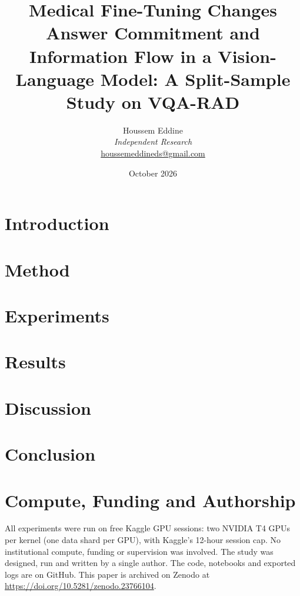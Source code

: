 \documentclass[11pt,a4paper]{article}
\title{\textbf{Medical Fine-Tuning Changes Answer Commitment and Information Flow in a Vision-Language Model: A Split-Sample Study on VQA-RAD}}
\author{%
  Houssem Eddine\\
  \textit{Independent Research}\\
  \href{mailto:houssemeddineds@gmail.com}{houssemeddineds@gmail.com}
}
\date{October 2026}
\begin{document}
\maketitle

\begin{abstract}

\end{abstract}

\section{Introduction}


\section{Method}


\section{Experiments}


\section{Results}


\section{Discussion}
\label{sec:discussion}


\section{Conclusion}
\label{sec:conclusion}


\section*{Compute, Funding and Authorship}
All experiments were run on free Kaggle GPU sessions: two NVIDIA T4 GPUs per kernel
(one data shard per GPU), with Kaggle's 12-hour session cap. No institutional compute,
funding or supervision was involved. The study was designed, run and written by a single
author. The code, notebooks and exported logs are on GitHub. This paper is archived on
Zenodo at \url{https://doi.org/10.5281/zenodo.23766104}.



\end{document}
